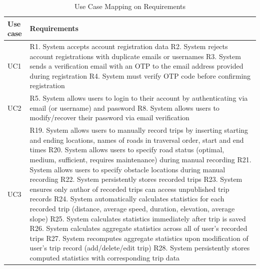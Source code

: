 \begin{longtable}{|p{3cm}|p{12cm}|}
    
    \caption[]{Use Case Mapping on Requirements} \\
    \hline
    \textbf{Use case} & \textbf{Requirements} \\ \hline
    \endhead
   UC1 & 
   R1. System accepts account registration data \newline
   R2. System rejects account registrations with duplicate emails or usernames \newline 
   R3. System sends a verification email with an OTP to the email address provided during registration \newline 
   R4. System must verify OTP code before confirming registration \\ \hline
   UC2 &
   R5. System allows users to login to their account by authenticating via email (or username) and password \newline 
   R8. System allows users to modify/recover their password via email verification \\ \hline
   UC3 & 
   R19. System allows users to manually record trips by inserting starting and ending locations, names of roads in traversal order, start and end times \newline 
   R20. System allows users to specify road status (optimal, medium, sufficient, requires maintenance) during manual recording \newline 
   R21. System allows users to specify obstacle locations during manual recording \newline 
   R22. System persistently stores recorded trips \newline 
   R23. System ensures only author of recorded trips can access unpublished trip records \newline 
   R24. System automatically calculates statistics for each recorded trip (distance, average speed, duration, elevation, average slope) \newline 
   R25. System calculates statistics immediately after trip is saved \newline 
   R26. System calculates aggregate statistics across all of user’s recorded trips \newline 
   R27. System recomputes aggregate statistics upon modification of user’s trip record (add/delete/edit trip) \newline 
   R28. System persistently stores computed statistics with corresponding trip data \newline 

\end{longtable}

